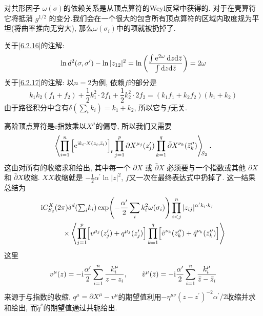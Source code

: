 对共形因子 $\omega(\sigma)$的依赖关系是从顶点算符的Weyl反常中获得的. 对于在壳算符它将抵消 $g^{1 / 2}$ 的变分.我们会在一个很大的包含所有顶点算符的区域内取度规为平坦(将曲率推向无穷大), 那么$\omega(\sigma_{i})$中的项就被扔掉了.
\begin{tcolorbox}
	关于\eqref{6.2.16}的注解:
	\[
		\ln d^{2}(\sigma, \sigma^{\prime})-\ln |z_{12}|^{2}=
		\ln \left(\frac{\int \mathrm{e}^{2 \omega} \: \mathrm{d} z \mathrm{d} \bar{z}}{\int \mathrm{d} z \mathrm{d}  \bar{z}}\right)=2 \omega	
	\]
	关于\eqref{6.2.17}的注解: 以$n=2$为例, 依赖$f$的部分是 
\[
k_{1} k_{2} (f_{1}+f_{2})+\frac{1}{2} k_{1}^{2} \cdot 2 f_{1}+\frac{1}{2} k_{2}^{2} \cdot 2 f_{2} 
=(k_{1} f_{1}+k_{2} f_{2})(k_{1}+k_{2})
\]
由于路径积分中含有$\delta(\sum_{i} k_{i})= k_{1}+k_{2}$, 所以它与$f$无关.
\end{tcolorbox}

高阶顶点算符是e指数乘以$X^{\mu}$的偏导, 所以我们又需要
\begin{equation}
	\Biggl\langle\prod_{i=1}^{n}\left[\mathrm{e}^{\mathrm{i} k_{i} \cdot X(z_{i}, \bar{z}_{i})}\right]_{\mathrm{r}} 
	\prod_{j=1}^{p} \partial X^{\mu_{j}}(z_{j}^{\prime}) \prod_{k=1}^{q} \bar{\partial} X^{\nu_{k}}(\bar{z}_{k}^{\prime \prime})\Biggr\rangle \biggr._{\!\!S_{2}} \:. \label{6.2.18}
\end{equation}
这由对所有的收缩求和给出, 其中每一个 $\partial X$ 或 $\bar{\partial} X$ 必须要与一个指数或其他 $\partial X$ 和 $\bar{\partial} X$收缩. 
$XX$收缩就是 $-\frac{1}{2} \alpha^{\prime} \ln |z|^{2}$, $f$又一次在最终表达式中扔掉了. 这一结果总结为
	\begin{align}
		&\mathrm{i} C_{S_{2}}^{X}(2 \pi)  \delta^{d}({\textstyle\sum_{i} }k_{i}) 
		\exp\Biggl(-\frac{\alpha'}{2}\sum_{i}k_{i}^{2}\omega(\sigma_{i})\Biggr)
		\prod_{i<j}^{n}|z_{i j}|^{\alpha^{\prime} k_{i} \cdot k_{j}}  \nonumber \\
		& \qquad \quad \times\Biggl\langle 
		\prod_{j=1}^{p}\Bigl[v^{\mu_{j}}(z_{j}^{\prime})+q^{\mu_{j}}(z_{j}^{\prime})\Bigr] 
		\prod_{k=1}^{q}\Bigl[\tilde{v}^{\nu_{k}}(\bar{z}_{k}^{\prime \prime})+\tilde{q}^{\nu_{k}}(\bar{z}_{k}^{\prime \prime})\Bigr]\Biggr\rangle  \label{6.2.19}
	\end{align}
这里
\begin{equation}
	v^{\mu}(z)=- \mathrm{i} \frac{\alpha^{\prime}}{2} \sum_{i=1}^{n} \frac{k_{i}^{\mu}}{z-z_{i}}, \qquad 
	\tilde{v}^{\mu}(\bar{z})=-\mathrm{i} \frac{\alpha^{\prime}}{2} \sum_{i=1}^{n} \frac{k_{i}^{\mu}}{\bar{z}-\bar{z}_{i}} \label{6.2.20}
\end{equation}
来源于与指数的收缩. $q^{\mu}=\partial X^{\mu}-v^{\mu}$的期望值利用$-\eta^{\mu \nu}(z-z^{\prime})^{-2} \alpha^{\prime} / 2$收缩并求和给出, 
而$\tilde{q}^{\nu}$的期望值通过共轭给出.

